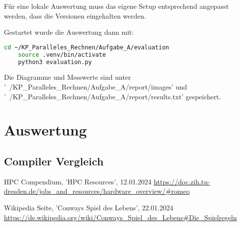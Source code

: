 \documentclass[plainarticle,zihtitle,german,final,hyperref,utf8]{zihpub}
\begin{document}
Für eine lokale Auswertung muss das eigene Setup entsprechend angepasst werden, dass die Versionen eingehalten werden.

Gestartet wurde die Auswertung dann mit:

\begin{lstlisting}[language=bash]
	cd ~/KP_Paralleles_Rechnen/Aufgabe_A/evaluation
	source .venv/bin/activate
	python3 evaluation.py
\end{lstlisting}

Die Diagramme und Messwerte sind unter '~/KP\_Paralleles\_Rechnen/Aufgabe\_A/report/images' und '~/KP\_Paralleles\_Rechnen/Aufgabe\_A/report/results.txt' gespeichert.

\section{Auswertung}
\subsection{Compiler Vergleich}

\newpage
\begin{thebibliography}{9}
	HPC Compendium, 'HPC Resources', 12.01.2024\newline
	\url{https://doc.zih.tu-dresden.de/jobs_and_resources/hardware_overview/#romeo}
	
	Wikipedia Seite, 'Conways Spiel des Lebens', 22.01.2024\newline
	\url{https://de.wikipedia.org/wiki/Conways_Spiel_des_Lebens#Die_Spielregeln}
\end{thebibliography}
\end{document}
